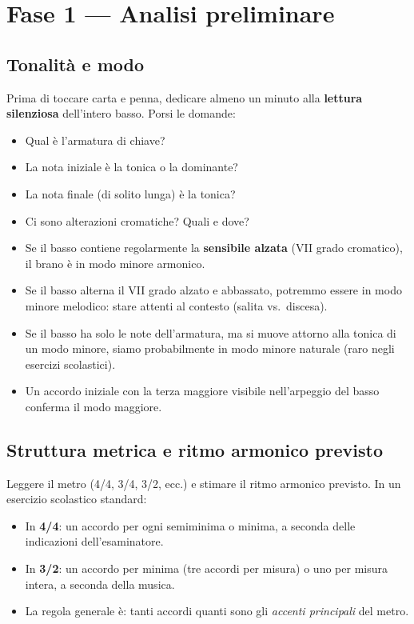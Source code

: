 \section{Fase 1 — Analisi preliminare}
\label{sec:fase1_basso}

\subsection{Tonalità e modo}

Prima di toccare carta e penna, dedicare almeno un minuto alla \textbf{lettura silenziosa} dell'intero basso. Porsi le domande:
\begin{itemize}
	\item Qual è l'armatura di chiave?
	\item La nota iniziale è la tonica o la dominante?
	\item La nota finale (di solito lunga) è la tonica?
	\item Ci sono alterazioni cromatiche? Quali e dove?
\end{itemize}

\begin{regola}
	\label{reg:lettura_diagnostica}
	\begin{itemize}
		\item Se il basso contiene regolarmente la \textbf{sensibile alzata} (VII grado cromatico), il brano è in modo minore armonico.
		\item Se il basso alterna il VII grado alzato e abbassato, potremmo essere in modo minore melodico: stare attenti al contesto (salita vs.\ discesa).
		\item Se il basso ha solo le note dell'armatura, ma si muove attorno alla tonica di un modo minore, siamo probabilmente in modo minore naturale (raro negli esercizi scolastici).
		\item Un accordo iniziale con la terza maggiore visibile nell'arpeggio del basso conferma il modo maggiore.
	\end{itemize}
\end{regola}

\subsection{Struttura metrica e ritmo armonico previsto}

Leggere il metro (4/4, 3/4, 3/2, ecc.) e stimare il ritmo armonico previsto. In un esercizio scolastico standard:
\begin{itemize}
	\item In \textbf{4/4}: un accordo per ogni semiminima o minima, a seconda delle indicazioni dell'esaminatore.
	\item In \textbf{3/2}: un accordo per minima (tre accordi per misura) o uno per misura intera, a seconda della musica.
	\item La regola generale è: tanti accordi quanti sono gli \textit{accenti principali} del metro.
\end{itemize}

